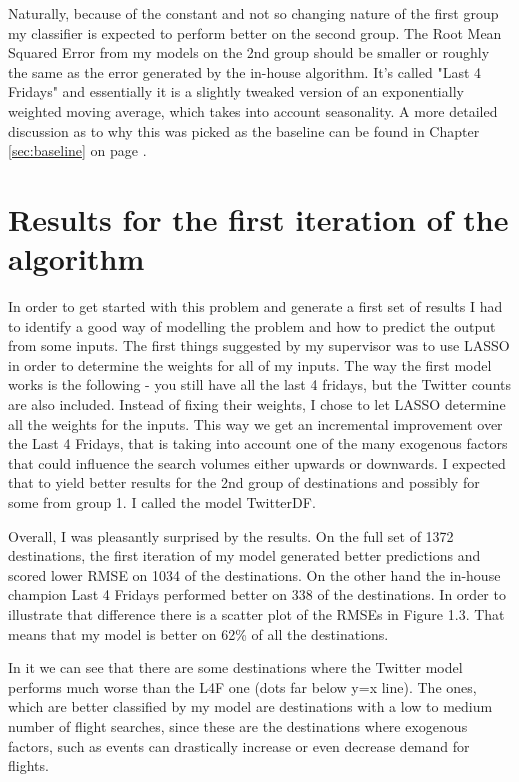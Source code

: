 \documentclass[minf,frontabs,twoside,singlespacing,parskip]{infthesis}
\begin{document}
Naturally, because of the constant and not so changing nature of the first group my classifier is expected to perform better on the second group. The Root Mean Squared Error from my models on the 2nd group should be smaller or roughly the same as the error generated by the in-house algorithm. It's called  "Last 4 Fridays" and essentially it is a slightly tweaked version of an exponentially weighted moving average, which takes into account seasonality. A more detailed discussion as to why this was picked as the baseline can be found in Chapter \ref{sec:baseline} on page \pageref{sec:baseline}.


\section{Results for the first iteration of the algorithm}


In order to get started with this problem and generate a first set of results I had to identify a good way of modelling the problem and how to predict the output from some inputs. The first things suggested by my supervisor was to use LASSO \cite{lasso} in order to determine the weights for all of my inputs. The way the first model works is the following - you still have all the last 4 fridays, but the Twitter counts are also included. Instead of fixing their weights, I chose to let LASSO determine all the weights for the inputs. This way we get an incremental improvement over the Last 4 Fridays, that is taking into account one of the many exogenous factors that could influence the search volumes either upwards or downwards. I expected that to yield better results for the 2nd group of destinations and possibly for some from group 1. I called the model TwitterDF.


Overall, I was pleasantly surprised by the results. On the full set of 1372 destinations, the first iteration of my model generated better predictions and scored lower RMSE on 1034 of the destinations. On the other hand the in-house champion Last 4 Fridays performed better on 338 of the destinations. In order to illustrate that difference there is a scatter plot of the RMSEs in Figure 1.3. That means that my model is better on 62\% of all the destinations.


In it we can see that there are some destinations where the Twitter model performs much worse than the L4F one (dots far below y=x line). The ones, which are better classified by my model are destinations with a low to medium number of flight searches, since these are the destinations where exogenous factors, such as events can drastically increase or even decrease demand for flights.
\end{document}
